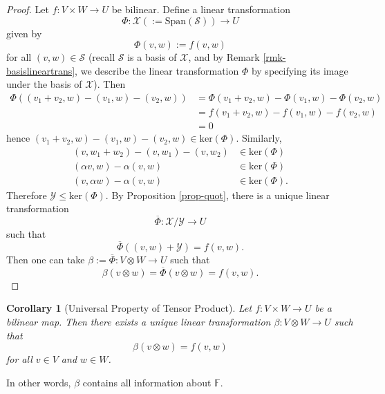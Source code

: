 \documentclass[11pt,openany]{book}
\theoremstyle{plain}
\newtheorem{corollary}[corollary]{Corollary}
\theoremstyle{definition}
\theoremstyle{remark}
\begin{document}
\begin{proof}
    \medskip
    Let $f : V \times W \to U$ be bilinear. Define a linear transformation
    $$\Phi : \mathcal{X} (:= \mathrm{Span}(\mathcal{S})) \to U$$
    given by 
    $$\Phi(v, w) := f(v,w)$$
    for all $(v,w) \in \mathcal{S}$ (recall $\mathcal{S}$ is a basis of $\mathcal{X}$, and by Remark \ref{rmk-basislineartrans}, we describe the linear transformation $\Phi$ by specifying its image under the basis of $\mathcal{X}$). Then 
    \begin{align*}
        \Phi((v_1+v_2, w)-(v_1, w)-(v_2, w)) &= \Phi(v_1+v_2, w)- \Phi(v_1, w)- \Phi(v_2, w) \\
        &= f(v_1+v_2, w)-f(v_1, w)-f(v_2, w) \\
        &= 0
    \end{align*}
    hence $(v_1+v_2, w)-(v_1, w)-(v_2, w) \in \mathrm{ker}(\Phi).$
    Similarly,
    \begin{align*}
        (v, w_1+w_2)-(v, w_1)-(v, w_2) &\in \mathrm{ker}(\Phi) \\
        (\alpha v, w)-\alpha (v, w) &\in \mathrm{ker}(\Phi) \\
        (v, \alpha w)-\alpha (v, w) &\in \mathrm{ker}(\Phi).
    \end{align*}
    Therefore $\mathcal{Y} \leq \mathrm{ker}(\Phi)$.
    By Proposition \ref{prop-quot}, there is a unique linear transformation
    $$\overline{\Phi} : \mathcal{X}/\mathcal{Y} \to U$$
    such that
    $$\overline{\Phi}((v, w)+\mathcal{Y}) = f(v, w).$$
    Then one can take $\beta := \overline{\Phi} : V \otimes W \to U$ such that
    $$\beta(v \otimes w) = \overline{\Phi}(v \otimes w) = f(v, w).$$
\end{proof}

\begin{corollary}[Universal Property of Tensor Product]
    Let $f:V \times W \to U$ be a bilinear map. Then there exists a unique linear transformation $\beta: V\otimes W \to U$ such that 
    $$\beta(v \otimes w) = f(v,w)$$
    for all $v \in V$ and $w \in W$. 
\end{corollary}
In other words, $\beta$ contains all information about $\mathbb{F}$.
\end{document}
